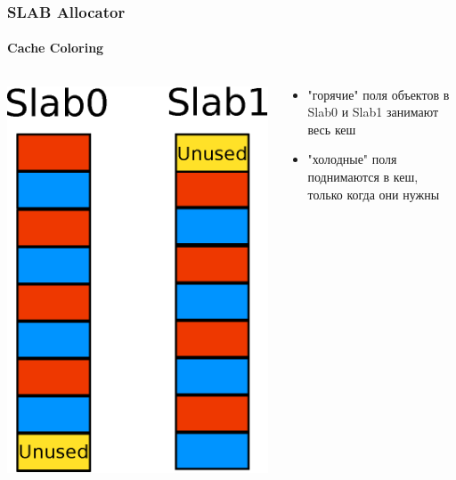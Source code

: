 \begin{frame}
\frametitle{SLAB Allocator}
\framesubtitle{Cache Coloring}

\begin{columns}[T]

  \begin{column}{.3\textwidth}
    \includegraphics[width=\linewidth]{slab-color1}
  \end{column}

  \begin{column}{.7\textwidth}
    \begin{itemize}
      \item "горячие" поля объектов в Slab0 и Slab1 занимают весь кеш
      \item "холодные" поля поднимаются в кеш, только когда они нужны
    \end{itemize}
  \end{column}

\end{columns}

\end{frame}

